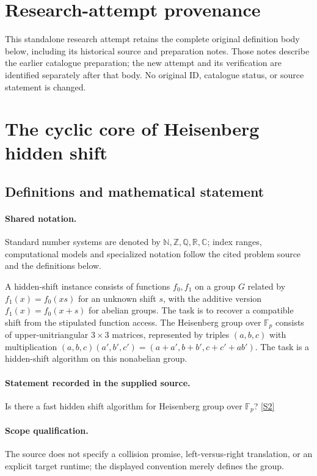 \documentclass[11pt]{article}
\begin{document}
\section*{Research-attempt provenance}
This standalone research attempt retains the complete original definition body below,
including its historical source and preparation notes. Those notes describe the
earlier catalogue preparation; the new attempt and its verification are identified
separately after that body. No original ID, catalogue status, or source statement is changed.

\section{The cyclic core of Heisenberg hidden shift}\label{statement}

\subsection{Definitions and mathematical statement}

\paragraph{Shared notation.}Standard number systems are denoted by $\mathbb N,\mathbb Z,\mathbb Q,\mathbb R,\mathbb C$; index ranges, computational models and specialized notation follow the cited problem source and the definitions below.


A hidden-shift instance consists of functions $f_0,f_1$ on a group $G$ related by $f_1(x)=f_0(xs)$ for an unknown shift $s$, with the additive version $f_1(x)=f_0(x+s)$ for abelian groups. The task is to recover a compatible shift from the stipulated function access. The Heisenberg group over $\mathbb F_p$ consists of upper-unitriangular $3\times3$ matrices, represented by triples $(a,b,c)$ with multiplication $(a,b,c)(a',b',c')=(a+a',b+b',c+c'+ab')$. The task is a hidden-shift algorithm on this nonabelian group.
\paragraph{Statement recorded in the supplied source.}
Is there a fast hidden shift algorithm for Heisenberg group over $\mathbb F_p$? \href{http://aimpl.org/quantumalg/4/}{[S2]}
\paragraph{Scope qualification.}
The source does not specify a collision promise, left-versus-right translation, or an explicit target runtime; the displayed convention merely defines the group.
\end{document}
